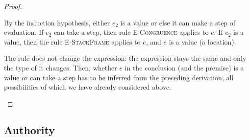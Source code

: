 \documentclass{llncs}
\newcommand{\pcase}[1][]{%
  \if\relax\detokenize{#1}\relax
    \def\thiscase{}%
  \else
    \def\thiscase{~#1}%
  \fi
  \item
}
\begin{document}
\begin{proof}
\begin{pcases}
By the induction hypothesis, either $e_2$ is a value or else it can make a step of evaluation. If $e_2$ can take a step, then rule \textsc{E-Congruence} applies to $e$. If $e_2$ is a value, then the rule \textsc{E-StackFrame} applies to $e$, and $e$ is a value (a location).
\\
\pcase[\textsc{T-Sub}]
The rule does not change the expression: the expression stays the same and only the type of it changes. Then, whether $e$ in the conclusion (and the premise) is a value or can take a step has to be inferred from the preceding derivation, all possibilities of which we have already considered above.

\end{pcases}

\end{proof}

\newpage

\subsection{Authority}
\end{document}
